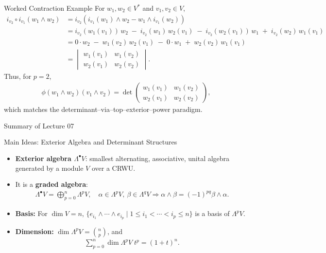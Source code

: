 \begin{frame}{Worked Contraction Example}
For $w_1,w_2\in V^*$ and $v_1,v_2\in V$,
\begin{align*}
i_{v_2}\circ i_{v_1}(w_1\wedge w_2)
&= i_{v_2}\left( i_{v_1}(w_1)\wedge w_2 - w_1\wedge i_{v_1}(w_2)\right)\\
&= i_{v_2}(w_1(v_1))\, w_2 \;-\; i_{v_2}(w_1)\, w_2(v_1) \;-\; i_{v_2}(w_2(v_1))\, w_1 \;+\; i_{v_2}(w_2)\, w_1(v_1)\\
&= 0 \cdot w_2 \;-\; w_1(v_2)\, w_2(v_1) \;-\; 0 \cdot w_1 \;+\; w_2(v_2)\, w_1(v_1)\\
&= \begin{vmatrix}
w_1(v_1) & w_1(v_2)\\
w_2(v_1) & w_2(v_2)
\end{vmatrix}.
\end{align*}
Thus, for $p=2$,
\begin{align*}
\phi(w_1\wedge w_2)(v_1\wedge v_2)=\det\!\begin{pmatrix}
w_1(v_1) & w_1(v_2)\\
w_2(v_1) & w_2(v_2)
\end{pmatrix},
\end{align*}
which matches the determinant–via–top–exterior–power paradigm.
\end{frame}

\begin{frame}{Summary of Lecture 07}
\vspace{-0.3cm}
\begin{block}{Main Ideas: Exterior Algebra and Determinant Structures}
\begin{itemize}
  \item \textbf{Exterior algebra $\Lambda^{\bullet}V$}: smallest alternating, associative, unital algebra generated by a module $V$ over a CRWU.
  \item It is a \textbf{graded algebra}:
  \vspace{-0.4cm}
  \begin{align*}
  \Lambda^{\bullet}V = \bigoplus_{p=0}^{n} \Lambda^{p}V, \quad
  \alpha\in\Lambda^{p}V, \ \beta\in\Lambda^{q}V \Rightarrow
  \alpha\wedge\beta=(-1)^{pq}\beta\wedge\alpha.
  \end{align*}
  \item \textbf{Basis:} For $\dim V=n$, $\{e_{i_1}\wedge\cdots\wedge e_{i_p}\mid 1\le i_1<\cdots<i_p\le n\}$ is a basis of $\Lambda^{p}V$.
  \item \textbf{Dimension:} $\dim\Lambda^{p}V=\binom{n}{p}$, and
  \vspace{-0.4cm}
  \begin{align*}
  \sum_{p=0}^{n}\dim\Lambda^{p}V\;t^p = (1+t)^{n}.
  \end{align*}
\end{itemize}
\end{block}
\end{frame}

